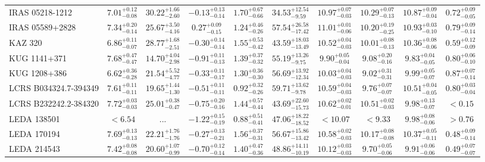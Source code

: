 \documentclass[onecolumn]{mn2e}
\begin{document}
\begin{landscape}
{\begin{center}
\begin{longtable}{lccccccccc}
IRAS 05218-1212 & $7.01_{-0.08}^{+0.12}$ & $30.22_{-2.60}^{+1.66}$ & $-0.13_{-0.14}^{+0.13}$ & $1.70_{-0.66}^{+0.67}$ &$34.53_{-9.59}^{+12.54}$ & $10.97_{-0.03}^{+0.07}$ & $10.29_{-0.13}^{+0.07}$ & $10.87_{-0.04}^{+0.09}$ & $0.72_{-0.05}^{+0.09}$ \\
IRAS 05589+2828 & $7.34_{-0.14}^{+0.20}$ & $25.67_{-4.16}^{+3.50}$ & $0.27_{-0.15}^{+0.09}$ & $1.24_{-0.26}^{+0.46}$ &$57.54_{-17.42}^{+26.58}$ & $11.01_{-0.06}^{+0.01}$ & $10.20_{-0.25}^{+0.19}$ & $10.93_{-0.10}^{+0.03}$ & $0.79_{-0.14}^{+0.09}$ \\
KAZ 320 & $6.86_{-0.07}^{+0.11}$ & $28.77_{-2.51}^{+1.68}$ & $-0.30_{-0.14}^{+0.14}$ & $1.55_{-0.42}^{+0.53}$ &$43.59_{-13.49}^{+18.03}$ & $10.52_{-0.03}^{+0.04}$ & $10.01_{-0.13}^{+0.08}$ & $10.36_{-0.06}^{+0.08}$ & $0.59_{-0.09}^{+0.12}$ \\
KUG 1141+371 & $7.68_{-0.47}^{+0.47}$ & $14.70_{-2.98}^{+4.04}$ & $-0.91_{-0.13}^{+0.11}$ & $1.39_{-0.32}^{+0.37}$ &$55.19_{-9.75}^{+13.26}$ & $9.90_{-0.04}^{+0.05}$ & $9.08_{-0.16}^{+0.20}$ & $9.83_{-0.05}^{+0.04}$ & $0.80_{-0.10}^{+0.06}$ \\
KUG 1208+386 & $6.62_{-0.28}^{+0.36}$ & $21.54_{-4.77}^{+5.52}$ & $-0.33_{-0.17}^{+0.11}$ & $1.30_{-0.30}^{+0.36}$ &$56.69_{-12.34}^{+13.92}$ & $10.03_{-0.03}^{+0.04}$ & $9.02_{-0.31}^{+0.31}$ & $9.99_{-0.07}^{+0.05}$ & $0.87_{-0.14}^{+0.07}$ \\
LCRS B034324.7-394349 & $7.61_{-0.11}^{+0.11}$ & $19.65_{-1.30}^{+1.44}$ & $-0.51_{-0.11}^{+0.11}$ & $0.92_{-0.26}^{+0.32}$ &$59.71_{-9.78}^{+13.62}$ & $10.59_{-0.03}^{+0.04}$ & $9.76_{-0.07}^{+0.07}$ & $10.51_{-0.05}^{+0.04}$ & $0.80_{-0.04}^{+0.03}$ \\
LCRS B232242.2-384320 & $7.72_{-0.03}^{+0.03}$ & $25.01_{-0.47}^{+0.38}$ & $-0.75_{-0.16}^{+0.20}$ & $1.44_{-0.44}^{+0.57}$ &$43.69_{-15.73}^{+22.60}$ & $10.62_{-0.01}^{+0.02}$ & $10.51_{-0.03}^{+0.02}$ & $9.98_{-0.07}^{+0.13}$ & $<0.15$ \\
LEDA 138501 & $<6.54$ & ... & $-1.22_{-0.19}^{+0.15}$ & $0.88_{-0.41}^{+0.51}$ &$47.06_{-18.52}^{+18.22}$ & $<10.07$ & $<9.33$ & $9.98_{-0.06}^{+0.08}$ & $>0.76$ \\
LEDA 170194 & $7.69_{-0.13}^{+0.13}$ & $22.21_{-1.76}^{+1.76}$ & $-0.27_{-0.21}^{+0.13}$ & $1.56_{-0.31}^{+0.37}$ &$56.67_{-13.42}^{+15.86}$ & $10.58_{-0.03}^{+0.02}$ & $10.17_{-0.08}^{+0.08}$ & $10.37_{-0.11}^{+0.05}$ & $0.48_{-0.14}^{+0.09}$ \\
LEDA 214543 & $7.42_{-0.08}^{+0.08}$ & $20.60_{-0.99}^{+1.07}$ & $-0.70_{-0.14}^{+0.12}$ & $1.40_{-0.36}^{+0.47}$ &$48.86_{-10.19}^{+14.11}$ & $10.12_{-0.03}^{+0.03}$ & $9.70_{-0.06}^{+0.05}$ & $9.91_{-0.06}^{+0.06}$ & $0.49_{-0.07}^{+0.07}$ \\

\end{longtable}
\end{center}}
\end{landscape}
\end{document}
